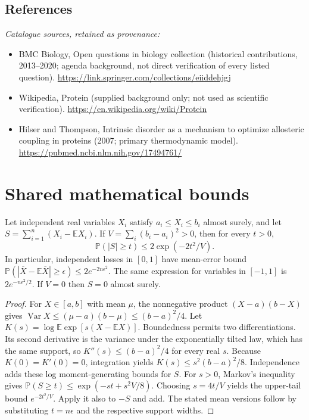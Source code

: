 \documentclass[11pt]{article}
\begin{document}
\subsection{References}
\noindent\emph{Catalogue sources, retained as provenance:}
\begin{itemize}
\item BMC Biology, Open questions in biology collection (historical contributions, 2013--2020; agenda background, not direct verification of every listed question). \url{https://link.springer.com/collections/eiiddehjgj}
\item Wikipedia, Protein (supplied background only; not used as scientific verification). \url{https://en.wikipedia.org/wiki/Protein}
\item Hilser and Thompson, Intrinsic disorder as a mechanism to optimize allosteric coupling in proteins (2007; primary thermodynamic model). \url{https://pubmed.ncbi.nlm.nih.gov/17494761/}
\end{itemize}




\section{Shared mathematical bounds}\label{app:bounds}
\begin{lemma}\label{lem:bounded}
Let independent real variables $X_i$ satisfy $a_i\leq X_i\leq b_i$ almost surely,
and let $S=\sum_{i=1}^n(X_i-\mathbb{E} X_i)$. If
$V=\sum_i(b_i-a_i)^2>0$, then for every $t>0$,
\[
 \mathbb{P}(|S|\geq t)\leq 2\exp(-2t^2/V).
\]
In particular, independent losses in $[0,1]$ have mean-error bound
$\mathbb{P}(|\overline X-\mathbb{E}\overline X|\geq\epsilon)
\leq2e^{-2n\epsilon^2}$. The same expression for variables in $[-1,1]$
is $2e^{-n\epsilon^2/2}$. If $V=0$ then $S=0$ almost surely.
\end{lemma}
\begin{proof}
For $X\in[a,b]$ with mean $\mu$, the nonnegative product
$(X-a)(b-X)$ gives
$\operatorname{Var} X\leq(\mu-a)(b-\mu)\leq(b-a)^2/4$.
Let $K(s)=\log\mathbb{E}\exp[s(X-\mathbb{E} X)]$.
Boundedness permits two differentiations. Its second derivative is the variance
under the exponentially tilted law, which has the same support, so
$K''(s)\leq(b-a)^2/4$ for every real $s$.
Because $K(0)=K'(0)=0$, integration yields
$K(s)\leq s^2(b-a)^2/8$.
Independence adds these log moment-generating bounds for $S$.
For $s>0$, Markov's inequality gives
$\mathbb{P}(S\geq t)\leq\exp(-st+s^2V/8)$.
Choosing $s=4t/V$ yields the upper-tail bound $e^{-2t^2/V}$.
Apply it also to $-S$ and add. The stated mean versions follow by substituting
$t=n\epsilon$ and the respective support widths.
\end{proof}
\end{document}
